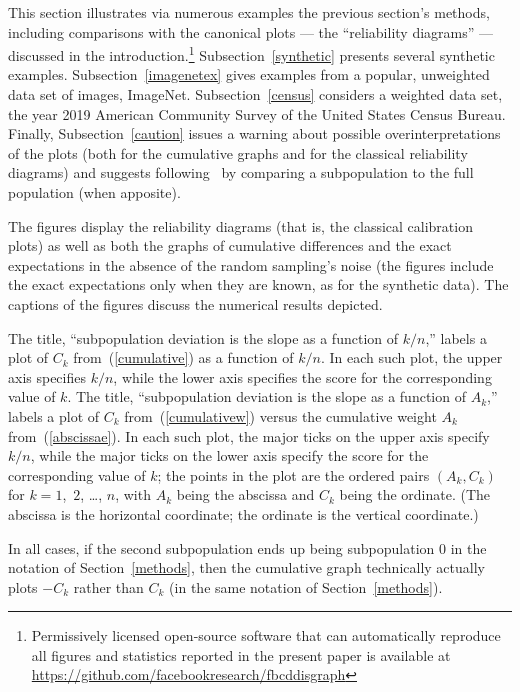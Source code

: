 \documentclass{article}
\begin{document}
This section illustrates via numerous examples
the previous section's methods, including comparisons
with the canonical plots --- the ``reliability diagrams'' ---
discussed in the introduction.\footnote{Permissively licensed open-source
software that can automatically reproduce all figures and statistics reported
in the present paper is available at
\url{https://github.com/facebookresearch/fbcddisgraph}}
Subsection~\ref{synthetic} presents several synthetic examples.
Subsection~\ref{imagenetex} gives examples
from a popular, unweighted data set of images, ImageNet.
Subsection~\ref{census} considers a weighted data set,
the year 2019 American Community Survey of the United States Census Bureau.
Finally, Subsection~\ref{caution} issues a warning
about possible overinterpretations of the plots (both for the cumulative graphs
and for the classical reliability diagrams)
and suggests following~\cite{tygert} by comparing a subpopulation
to the full population (when apposite).

The figures display the reliability diagrams
(that is, the classical calibration plots)
as well as both the graphs of cumulative differences and the exact expectations
in the absence of the random sampling's noise (the figures include
the exact expectations only when they are known, as for the synthetic data).
The captions of the figures discuss the numerical results depicted.

The title, ``subpopulation deviation is the slope as a function of $k/n$,''
labels a plot of $C_k$ from~(\ref{cumulative}) as a function of $k/n$.
In each such plot, the upper axis specifies $k/n$,
while the lower axis specifies the score for the corresponding value of $k$.
The title, ``subpopulation deviation is the slope as a function of $A_k$,''
labels a plot of $C_k$ from~(\ref{cumulativew}) versus 
the cumulative weight $A_k$ from~(\ref{abscissae}).
In each such plot, the major ticks on the upper axis specify $k/n$,
while the major ticks on the lower axis specify the score
for the corresponding value of $k$; the points in the plot
are the ordered pairs $(A_k, C_k)$ for $k = 1$,~$2$, \dots, $n$,
with $A_k$ being the abscissa and $C_k$ being the ordinate.
(The abscissa is the horizontal coordinate;
the ordinate is the vertical coordinate.)

In all cases, if the second subpopulation ends up being subpopulation 0
in the notation of Section~\ref{methods}, then the cumulative graph technically
actually plots $-C_k$ rather than $C_k$
(in the same notation of Section~\ref{methods}).
\end{document}

